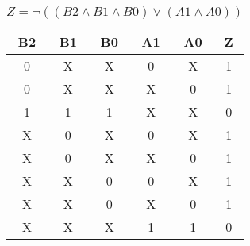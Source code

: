 
\begin{center}
    \begin{table}[h] \caption{\(Z = \lnot ((B2 \land B1 \land B0) \lor (A1 \land A0)) \)}
        \begin{center}
            \begin{tabular}{|c|c|c|c|c||c|} \hline
            B2 & B1 & B0 & A1 & A0 & Z \\ \hline\hline
            0  & X  & X  & 0  & X  & 1\\ \hline
            0  & X  & X  & X  & 0  & 1\\ \hline
            1  & 1  & 1  & X  & X  & 0\\ \hline
            X  & 0  & X  & 0  & X  & 1\\ \hline
            X  & 0  & X  & X  & 0  & 1\\ \hline
            X  & X  & 0  & 0  & X  & 1\\ \hline
            X  & X  & 0  & X  & 0  & 1\\ \hline
            X  & X  & X  & 1  & 1  & 0\\ \hline
            \end{tabular}
        \end{center}
    \end{table}
\end{center}

